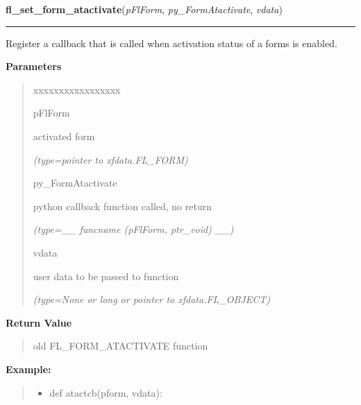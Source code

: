 \hspace{.8\funcindent}\begin{boxedminipage}{\funcwidth}

    \raggedright \textbf{fl\_set\_form\_atactivate}(\textit{pFlForm}, \textit{py\_FormAtactivate}, \textit{vdata})

    \vspace{-1.5ex}

    \rule{\textwidth}{0.5\fboxrule}
\setlength{\parskip}{2ex}
    Register a callback that is called when activation status of a forms is
    enabled.

\setlength{\parskip}{1ex}
      \textbf{Parameters}
      \vspace{-1ex}

      \begin{quote}
        \begin{Ventry}{xxxxxxxxxxxxxxxxx}

          \item[pFlForm]

          activated form

            {\it (type=pointer to xfdata.FL\_FORM)}

          \item[py\_FormAtactivate]

          python callback function called, no return

            {\it (type=\_\_ funcname (pFlForm, ptr\_void) \_\_)}

          \item[vdata]

          user data to be passed to function

            {\it (type=None or long or pointer to xfdata.FL\_OBJECT)}

        \end{Ventry}

      \end{quote}

      \textbf{Return Value}
    \vspace{-1ex}

      \begin{quote}
      old FL\_FORM\_ATACTIVATE function

      \end{quote}

\textbf{Example:}
\begin{quote}
  \begin{itemize}

  \item
    \setlength{\parskip}{0.6ex}
def atactcb(pform, vdata):




\end{itemize}
\end{quote}
\end{boxedminipage}
